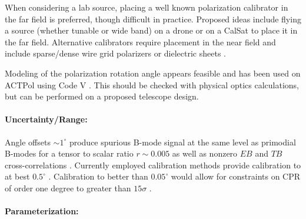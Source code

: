 When considering a lab source, placing a well known polarization
calibrator in the far field is preferred, though difficult in practice.
Proposed ideas include flying a source (whether tunable or wide band) on a
drone or on a CalSat to place it in the far field. Alternative calibrators
require placement in the near field and include sparse/dense wire grid
polarizers or dielectric sheets \cite{Takahashi2010, 2016arXiv160701825K}.

Modeling of the polarization rotation angle appears feasible and has been used
on ACTPol using Code V \cite{2016arXiv160701825K}. This should be checked with
physical optics calculations, but can be performed on a proposed telescope
design.

\paragraph{Uncertainty/Range:}

Angle offsets $\sim 1^{\circ}$ produce spurious B-mode signal at the same level
as primodial B-modes for a tensor to scalar ratio $r \sim 0.005$ as well as
nonzero $EB$ and $TB$ cross-correlations \cite{doi:10.1142/S0218271816400125}.
Currently employed calibration methods provide calibration to at best
$0.5^{\circ}$ \cite{2016MNRAS.455.1981K}. Calibration to better than
$0.05^{\circ}$ would allow for constraints on CPR of order one degree to
greater than $15\sigma$ \cite{2016MNRAS.455.1981K}.

\paragraph{Parameterization:}
